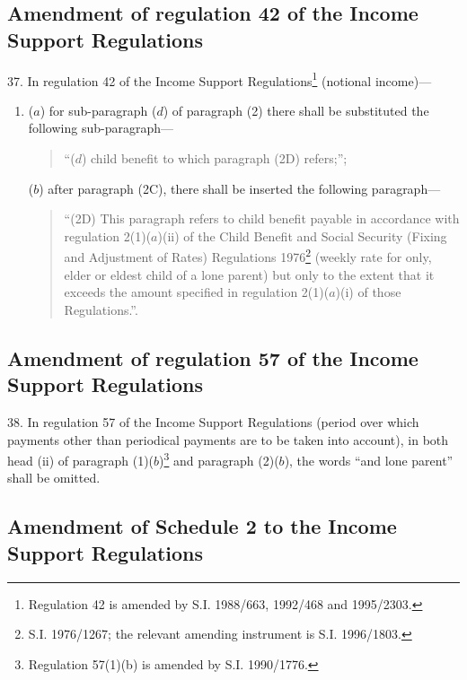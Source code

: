 \documentclass[a4paper]{article}
\begin{document}
\subsection[37. Amendment of regulation 42 of the Income Support Regulations]{Amendment of regulation 42 of the Income Support Regulations}

37.  In regulation 42 of the Income Support Regulations\footnote{\frenchspacing Regulation 42 is amended by S.I. 1988/663, 1992/468 and 1995/2303.} (notional income)—
\begin{enumerate}\item[]
($a$) for sub-paragraph ($d$) of paragraph (2) there shall be substituted the following sub-paragraph—
\begin{quotation}
“($d$) child benefit to which paragraph (2D) refers;”;
\end{quotation}

($b$) after paragraph (2C), there shall be inserted the following paragraph—
\begin{quotation}
“(2D) This paragraph refers to child benefit payable in accordance with regulation 2(1)($a$)(ii) of the Child Benefit and Social Security (Fixing and Adjustment of Rates) Regulations 1976\footnote{\frenchspacing S.I. 1976/1267; the relevant amending instrument is S.I. 1996/1803.} (weekly rate for only, elder or eldest child of a lone parent) but only to the extent that it exceeds the amount specified in regulation 2(1)($a$)(i) of those Regulations.”.
\end{quotation}
\end{enumerate}

\subsection[38. Amendment of regulation 57 of the Income Support Regulations]{Amendment of regulation 57 of the Income Support Regulations}

38.  In regulation 57 of the Income Support Regulations (period over which payments other than periodical payments are to be taken into account), in both head (ii) of paragraph (1)($b$)\footnote{\frenchspacing Regulation 57(1)(b) is amended by S.I. 1990/1776.} and paragraph (2)($b$), the words “and lone parent” shall be omitted.

\subsection[39. Amendment of Schedule 2 to the Income Support Regulations]{Amendment of Schedule 2 to the Income Support Regulations}
\end{document}
